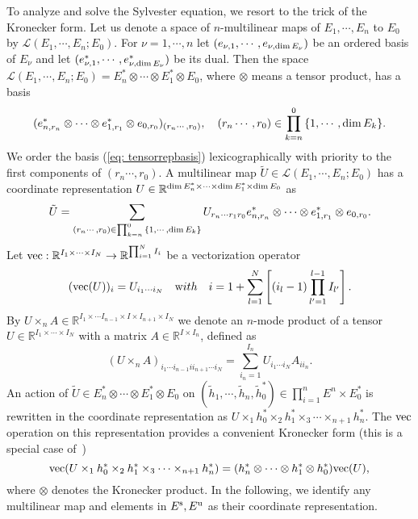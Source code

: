 \documentclass[a4paper,11pt,fleqn]{article}
\begin{document}
To analyze and solve the Sylvester equation, we resort to the trick of the Kronecker form. 
Let us denote a space of $n$-multilinear maps of $E_1,\cdots,E_n$ to $E_0$ by $\mathcal{L}(E_1,\cdots,E_n;E_0)$. 
For $\nu = 1,\cdots, n$ let $(e_{\nu,1},\cdots,e_{\nu,\mathop{\rm dim}{E_{\nu}}})$ be an ordered basis of $E_\nu$ and let $(e^*_{\nu,1},\cdots,e^*_{\nu,\mathop{\rm dim}{E_{\nu}}})$ be its dual. Then the space $\mathcal{L}(E_1,\cdots,E_n;E_0) = E_n^*\otimes\cdots\otimes E_1^*\otimes E_0$, where $\otimes$ means a tensor product, has a basis 
\begin{equation}
    (e^*_{n,r_n}\otimes\cdots\otimes e^*_{1,r_1}\otimes e_{0,r_0})_{(r_n\cdots,r_0)}, \quad (r_n\cdots,r_0)\in \prod_{k=n}^0{\{1,\cdots,\mathop{\rm dim}{E_{k}}\}}. \label{eq: tensorrepbasis}
\end{equation}
We order the basis (\ref{eq: tensorrepbasis}) lexicographically with priority to the first components of $(r_n\cdots,r_0)$. A multilinear map $\tilde{U}\in \mathcal{L}(E_1,\cdots,E_n;E_0)$ has a coordinate representation $U\in \mathbb{R}^{\mathop{\rm dim}{E_n^*}\times\cdots\times\mathop{\rm dim}{E_1^*}\times\mathop{\rm dim}{E_0}}$ as 
\begin{equation}
    \tilde{U} = \sum_{(r_n\cdots,r_0)\in \prod_{k=n}^0{\{1,\cdots,\mathop{\rm dim}{E_{k}}\}}} U_{r_n\cdots r_1r_0} e^*_{n,r_n}\otimes\cdots\otimes e^*_{1,r_1}\otimes e_{0,r_0}. 
\end{equation}
Let ${\rm vec}: \mathbb{R}^{I_1\times\cdots \times I_N} \to \mathbb{R}^{\prod_{i=1}^N{I_i}}$ be a vectorization operator
\begin{equation}
    ({\rm vec}(U))_i = U_{i_1\cdots i_{N}} \quad {\text with} \quad i = 1+\sum_{l=1}^N\left[(i_l -1)\prod_{l'=1}^{l-1}I_{l'} \right]. 
\end{equation}
By $U\times_n A \in \mathbb{R}^{I_1\times\cdots I_{n-1}\times I \times I_{n+1} \times I_N}$ we denote an $n$-mode product of a tensor~\cite{kolda2006multilinear} $U\in \mathbb{R}^{I_1\times\cdots \times I_N}$ with a matrix $A\in \mathbb{R}^{I\times I_n}$, defined as 
\begin{equation}
    (U\times_n A)_{i_1\cdots i_{n-1} i i_{n+1}\cdots i_N} = \sum_{i_n = 1}^{I_n}U_{i_1\cdots i_N}A_{i i_n}.
\end{equation}
An action of $\tilde{U}\in E_n^*\otimes\cdots\otimes E_1^*\otimes E_0$ on $(\tilde{h}_1,\cdots,\tilde{h}_n, \tilde{h}^*_0)\in \prod_{i=1}^n{E^n\times E^*_0}$ is rewritten in the coordinate representation as $U\times_1 h_0^* \times_2 h_1^* \times_3 \cdots \times_{n+1} h_n^*$. The ${\rm vec}$ operation on this representation provides a convenient Kronecker form (this is a special case of~\cite[Proposition~3.7~(b)]{kolda2006multilinear})
\begin{equation}
    {\rm vec}(U\times_1 h_0^* \times_2 h_1^* \times_3 \cdots \times_{n+1} h_n^*) = (h_n^*\otimes \cdots \otimes h_1^* \otimes h_0^*) {\rm vec}(U), 
\end{equation}
where $\otimes$ denotes the Kronecker product. In the following, we identify any multilinear map and elements in $E^{\rm s}, E^{\rm u}$ as their coordinate representation. 



\end{document}
